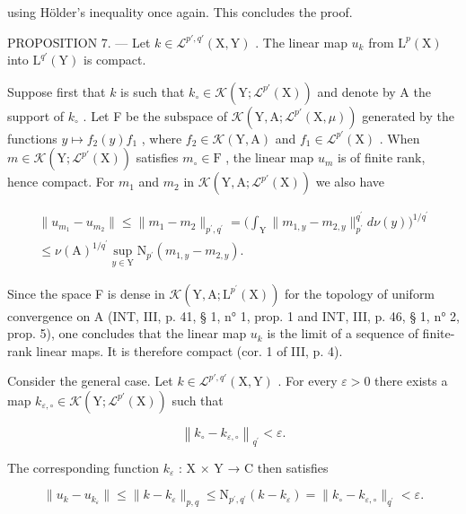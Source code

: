 using Hölder's inequality once again. This concludes the proof.

PROPOSITION 7. --- Let \(k \in \mathcal{L}^{p',q'}(\mathrm{X},\mathrm{Y})\) . The linear map \(u_k\) from \(\mathrm{L}^p (\mathrm{X})\) into \(\mathrm{L}^{q'}(\mathrm{Y})\) is compact.

Suppose first that \(k\) is such that \(k_{\circ} \in \mathcal{K}(\mathrm{Y}; \mathcal{L}^{p'}(\mathrm{X}))\) and denote by A the support of \(k_{\circ}\) . Let F be the subspace of \(\mathcal{K}(\mathrm{Y}, \mathrm{A}; \mathcal{L}^{p'}(\mathrm{X}, \mu))\) generated by the functions \(y \mapsto f_2(y)f_1\) , where \(f_2 \in \mathcal{K}(\mathrm{Y}, \mathrm{A})\) and \(f_1 \in \mathcal{L}^{p'}(\mathrm{X})\) . When \(m \in \mathcal{K}(\mathrm{Y}; \mathcal{L}^{p'}(\mathrm{X}))\) satisfies \(m_{\circ} \in \mathrm{F}\) , the linear map \(u_m\) is of finite rank, hence compact. For \(m_1\) and \(m_2\) in \(\mathcal{K}(\mathrm{Y}, \mathrm{A}; \mathcal{L}^{p'}(\mathrm{X}))\) we also have

\[
\begin{array}{c} \| u _ {m _ {1}} - u _ {m _ {2}} \| \leqslant \| m _ {1} - m _ {2} \| _ {p ^ {\prime}, q ^ {\prime}} = \Big (\int_ {\mathrm{Y}} \| m _ {1, y} - m _ {2, y} \| _ {p ^ {\prime}} ^ {q ^ {\prime}} d \nu (y) \Big) ^ {1 / q ^ {\prime}} \\ \leqslant \nu (\mathrm{A}) ^ {1 / q ^ {\prime}} \sup _ {y \in \mathrm{Y}} \mathrm{N} _ {p ^ {\prime}} (m _ {1, y} - m _ {2, y}). \end{array}
\]

Since the space F is dense in \(\mathcal{K}(\mathrm{Y},\mathrm{A};\mathrm{L}^{p^{\prime}}(\mathrm{X}))\) for the topology of uniform convergence on A (INT, III, p. 41, § 1, n° 1, prop. 1 and INT, III, p. 46, § 1, n° 2, prop. 5), one concludes that the linear map \(u_{k}\) is the limit of a sequence of finite-rank linear maps. It is therefore compact (cor. 1 of III, p. 4).

Consider the general case. Let \(k \in \mathcal{L}^{p', q'}(\mathrm{X}, \mathrm{Y})\) . For every \(\varepsilon > 0\) there exists a map \(k_{\varepsilon, \circ} \in \mathcal{K}(\mathrm{Y}; \mathcal{L}^{p'}(\mathrm{X}))\) such that

\[
\left\| k _ {\circ} - k _ {\varepsilon , \circ} \right\| _ {q ^ {\prime}} <   \varepsilon .
\]

The corresponding function \(k_{\varepsilon}\) : X × Y → C then satisfies

\[
\| u _ {k} - u _ {k _ {\varepsilon}} \| \leqslant \| k - k _ {\varepsilon} \| _ {p, q} \leqslant \mathrm{N} _ {p ^ {\prime}, q ^ {\prime}} (k - k _ {\varepsilon}) = \| k _ {\circ} - k _ {\varepsilon , \circ} \| _ {q ^ {\prime}} <   \varepsilon .
\]

